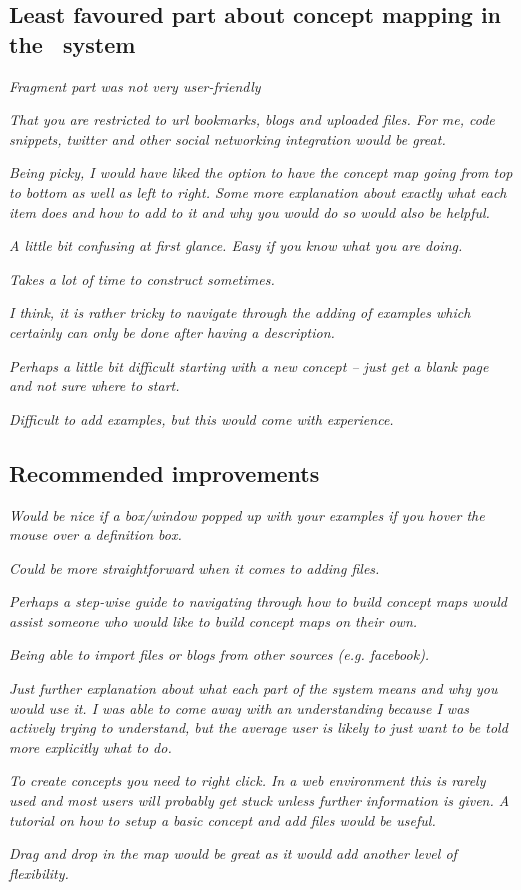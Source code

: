 \subsection{Least favoured part about concept mapping in the \ep~system}

\textit{Fragment part was not very user-friendly}

\textit{That you are restricted to url bookmarks, blogs and uploaded files. For
me, code snippets, twitter and other social networking integration would be
great.}

\textit{Being picky, I would have liked the option to have the concept map going
from top to bottom as well as left to right. Some more explanation about exactly
what each item does and how to add to it and why you would do so would also be
helpful.}

\textit{A little bit confusing at first glance. Easy if you know what you are
doing.}

\textit{Takes a lot of time to construct sometimes.}

\textit{I think, it is rather tricky to navigate through the adding of examples
which certainly can only be done after having a description.}

\textit{Perhaps a little bit difficult starting with a new concept -- just get a
blank page and not sure where to start.}

\textit{Difficult to add examples, but this would come with experience.}


\subsection{Recommended improvements}

\textit{Would be nice if a box/window popped up with your examples if you hover
the mouse over a definition box.}

\textit{Could be more straightforward when it comes to adding files.}

\textit{Perhaps a step-wise guide to navigating through how to build concept
maps would assist someone who would like to build concept maps on their own.}

\textit{Being able to import files or blogs from other sources (e.g. facebook).}

\textit{Just further explanation about what each part of the system means and
why you would use it. I was able to come away with an understanding because I
was actively trying to understand, but the average user is likely to just want
to be told more explicitly what to do. }

\textit{To create concepts you need to right click. In a web environment this is
rarely used and most users will probably get stuck unless further information is
given. A tutorial on how to setup a basic concept and add files would be useful.}

\textit{Drag and drop in the map would be great as it would add another level
of flexibility.}